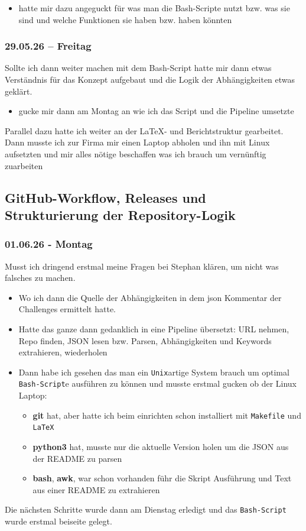 \begin{itemize}
  \item hatte mir dazu angeguckt für was man die Bash-Scripte nutzt bzw. was sie sind und welche Funktionen sie haben bzw. haben könnten
\end{itemize}
  
\subsubsection{29.05.26 -- Freitag}

Sollte ich dann weiter machen mit dem Bash-Script hatte mir dann etwas Verständnis für das Konzept aufgebaut und die Logik der Abhängigkeiten etwas geklärt.

\begin{itemize}
    \item gucke mir dann am Montag an wie ich das Script und die Pipeline umsetzte
\end{itemize}
Parallel dazu hatte ich weiter an der LaTeX- und Berichtstruktur gearbeitet.
Dann musste ich zur Firma mir einen Laptop abholen und ihn mit Linux aufsetzten und mir alles nötige beschaffen was ich brauch um vernünftig zuarbeiten

\subsection{GitHub-Workflow, Releases und Strukturierung der Repository-Logik}
\subsubsection{01.06.26 - Montag}

Musst ich dringend erstmal meine Fragen bei Stephan klären, um nicht was falsches zu machen.

\begin{itemize}[itemsep=2pt, topsep=4pt]
  \item Wo ich dann die Quelle der Abhängigkeiten in dem json Kommentar der Challenges ermittelt hatte.
  \item Hatte das ganze dann gedanklich in eine Pipeline übersetzt:
  URL nehmen, Repo finden, JSON lesen bzw. Parsen, Abhängigkeiten und Keywords extrahieren, wiederholen
  \item Dann habe ich gesehen das man ein \texttt{Unix}artige System brauch um optimal \texttt{Bash-Script}e ausführen zu können und musste erstmal gucken ob der Linux Laptop:
  \begin{itemize}
    \item \textbf{git} hat, aber hatte ich beim einrichten schon installiert mit \texttt{Makefile} und \texttt{LaTeX}
    \item \textbf{python3} hat, musste nur die aktuelle Version holen um die JSON aus der README zu parsen
    \item \textbf{bash}, \textbf{awk}, war schon vorhanden führ die Skript Ausführung und Text aus einer README zu extrahieren
  \end{itemize}
\end{itemize}
Die nächsten Schritte wurde dann am Dienstag erledigt und das \texttt{Bash-Script} wurde erstmal beiseite gelegt.

